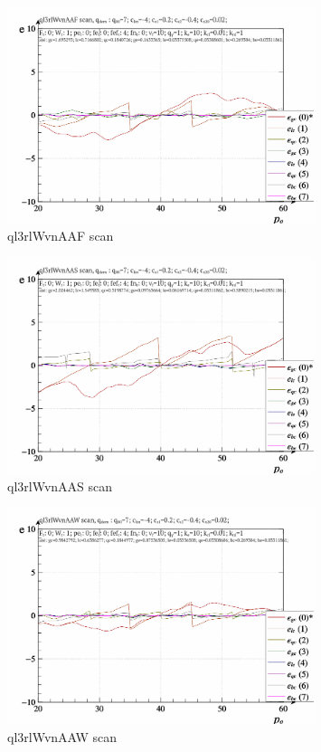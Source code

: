 \documentclass[a4paper,10pt]{article}
\begin{document}
\begin{figure}[htb!]
  \centerline{
    \includegraphics[width=0.8\textwidth]{qls-p_p_e_ql3rlWvnAAF_scan.png}
  }
  \caption{ql3rlWvnAAF scan}
  \label{atu:f:ql3rlWvnAAF_scan}
\end{figure}

\begin{figure}[htb!]
  \centerline{
    \includegraphics[width=0.8\textwidth]{qls-p_p_e_ql3rlWvnAAS_scan.png}
  }
  \caption{ql3rlWvnAAS scan}
  \label{atu:f:ql3rlWvnAAS_scan}
\end{figure}

\begin{figure}[htb!]
  \centerline{
    \includegraphics[width=0.8\textwidth]{qls-p_p_e_ql3rlWvnAAW_scan.png}
  }
  \caption{ql3rlWvnAAW scan}
  \label{atu:f:ql3rlWvnAAW_scan}
\end{figure}
\end{document}
